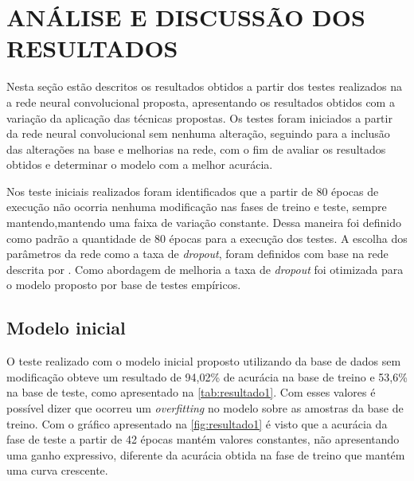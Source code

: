 
\chapter{ANÁLISE E DISCUSSÃO DOS RESULTADOS}


Nesta seção estão descritos os resultados obtidos a partir dos testes realizados na a rede neural convolucional proposta, apresentando os resultados obtidos com a variação da aplicação das técnicas propostas.
 Os testes foram iniciados a partir da rede neural convolucional sem nenhuma alteração, seguindo para a inclusão das alterações na base e melhorias na rede, com o fim de avaliar os resultados obtidos e determinar o modelo com a melhor acurácia.

\par Nos teste iniciais realizados foram identificados que a partir de 80 épocas de execução não ocorria nenhuma modificação nas fases de treino e teste, sempre mantendo,mantendo uma faixa de variação constante. Dessa maneira foi definido como padrão a quantidade de 80 épocas para a execução dos testes. A escolha dos parâmetros da rede como a taxa de \textit{dropout}, foram definidos com base na rede descrita por \cite{imaginetArticle}. Como abordagem de melhoria a taxa de \textit{dropout} foi otimizada para o modelo proposto por base de testes empíricos.


\section{Modelo inicial}
O teste realizado com o modelo inicial proposto utilizando da base de dados sem modificação obteve um resultado de 94,02\% de acurácia na base de treino e 53,6\% na base de teste, como apresentado na \autoref{tab:resultado1}. Com esses valores é possível dizer que ocorreu um \textit{overfitting} no modelo sobre as amostras da base de treino. Com o gráfico apresentado na \autoref{fig:resultado1} é visto que a acurácia da fase de teste a partir de 42 épocas mantém valores constantes, não apresentando uma ganho expressivo, diferente da acurácia obtida na fase de treino que mantém uma curva crescente.

